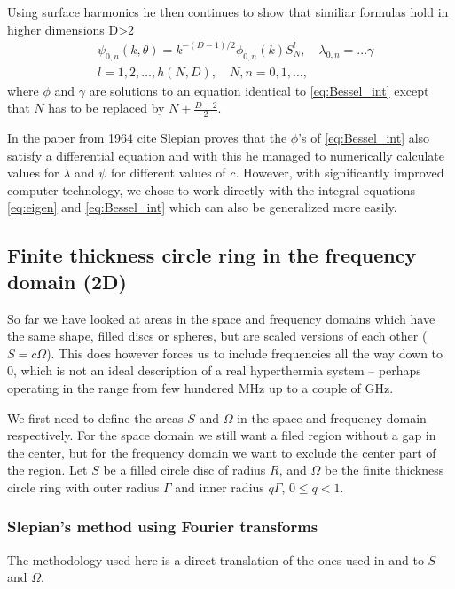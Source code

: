 \documentclass[11pt,a4paper, 
swedish,english %
]{article}
\begin{document}

Using surface harmonics he then continues to show that similiar formulas hold in higher dimensions D>2
\begin{align}
  &\psi_{0,n}(k,\theta)=k^{-(D-1)/2}\phi_{0,n}(k)S_N^l, \quad \lambda_{0,n}= ...\gamma \\
  &l= 1,2, \ldots , h(N,D), \quad N,n=0,1, \ldots,
\end{align}
where $\phi$ and $\gamma$ are solutions to an equation identical to \eqref{eq:Bessel_int} except that $N$ has to be replaced by $N+\frac{D-2}{2}$. 

In the paper from 1964 cite Slepian proves that the $\phi$'s of \eqref{eq:Bessel_int} also satisfy a differential equation and with this he managed to numerically calculate values for $\lambda$ and $\psi$ for different values of $c$. However, with significantly improved computer technology, we chose to work directly with the integral equations \eqref{eq:eigen} and \eqref{eq:Bessel_int} which can also be generalized more easily.
  




\subsection{Finite thickness circle ring in the frequency domain (2D)}
So far we have looked at areas in the space and frequency domains
which have the same shape, filled discs or spheres, but are scaled
versions of each other ($S=c\Omega$). This does however forces us to
include frequencies all the way down to 0, which is not an ideal
description of a real hyperthermia system -- perhaps operating in the
range from few hundered MHz up to a couple of GHz.

We first need to define the areas $S$ and $\Omega$ in the space and
frequency domain respectively. For the space domain we still want a
filed region without a gap in the center, but for the frequency domain
we want to exclude the center part of the region. Let $S$ be a filled
circle disc of radius $R$, and $\Omega$ be the finite thickness circle
ring with outer radius $\Gamma$ and inner radius $q\Gamma$, $0\le q<1$.

\subsubsection{Slepian's method using Fourier transforms}
The methodology used here is a direct translation of the ones used in
\cite{PSWF-I_1961} and \cite{PSWF-IV_1964} to $S$ and $\Omega$.
\end{document}
